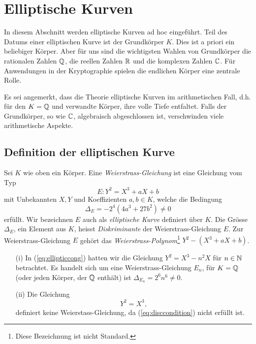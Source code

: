 \chapter{Elliptische Kurven}
\label{kap:ek}

In diesem Abschnitt werden elliptische Kurven ad hoc eingeführt.
Teil des Datums einer elliptischen Kurve ist der Grundkörper $K$. Dies
ist a priori ein beliebiger Körper. Aber für uns sind die wichtigsten
Wahlen von Grundkörper die rationalen Zahlen ${\mathbb{Q}}$, die reellen Zahlen
${\mathbb{R}}$ und die komplexen Zahlen ${\mathbb{C}}$. Für Anwendungen in der
Kryptographie spielen  die endlichen Körper eine zentrale Rolle.

Es sei angemerkt, dass die Theorie elliptische Kurven im
arithmetischen Fall, d.h. für den $K={\mathbb{Q}}$ und verwandte Körper, ihre
volle Tiefe entfaltet. Falls der Grundkörper, so wie ${\mathbb{C}}$,
algebraisch abgeschlossen ist, verschwinden viele arithmetische
Aspekte.

\section{Definition der elliptischen Kurve}

\begin{definition}
  Sei $K$ wie oben ein Körper.
  Eine \emph{Weierstrass-Gleichung} ist eine Gleichung vom Typ
  \begin{equation}
    \label{eq:weierstrass}
    E: Y^2 = X^3 + aX + b
  \end{equation}
  mit Unbekannten $X,Y$ und Koeffizienten $a,b\in K$, welche die
  Bedingung
  \begin{equation}
    \label{eq:disccondition}
    \Delta_E = -2^4(4a^3+27b^2)\not=0
  \end{equation}
  erfüllt. Wir bezeichnen $E$ auch als \emph{elliptische
    Kurve}
  definiert über $K$.
  Die Grösse $\Delta_E$, ein Element aus $K$, heisst
  \emph{Diskriminante}
  der Weierstrass-Gleichung $E$. Zur Weierstrass-Gleichung $E$ gehört
  das \emph{Weierstrass-Polynom}\footnote{Diese Bezeichnung ist nicht
    Standard.} $Y^2- (X^3+aX+b)$.
\end{definition}

\begin{beispiele}\leavevmode
  \begin{enumerate}
  \item [(i)] In (\ref{eq:ellipticcong}) hatten wir die Gleichung $Y^2 = X^3-n^2X$
    für $n\in{\mathbb{N}}$ betrachtet. Es handelt sich um eine
    Weierstrass-Gleichung $E_n$, für $K={\mathbb{Q}}$ (oder jeden Körper, der ${\mathbb{Q}}$
    enthält) ist $\Delta_{E_n} = 2^6 n^6 \not=0$.
  \item[(ii)] Die Gleichung
    \begin{equation*}
      Y^2 = X^3,
    \end{equation*}
    definiert keine Weierstass-Gleichung, da (\ref{eq:disccondition})
    nicht erfüllt ist.
  \end{enumerate}
\end{beispiele}

